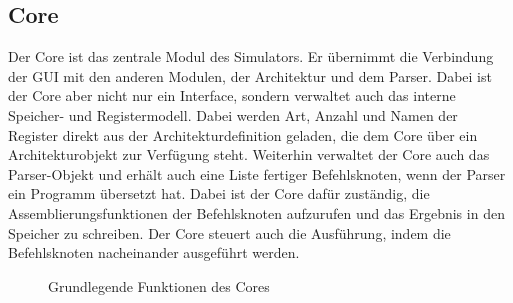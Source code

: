 \subsection{Core}
\label{Dev-Kapitel: Core}

Der Core ist das zentrale Modul des Simulators. Er übernimmt die Verbindung der
GUI mit den anderen Modulen, der Architektur und dem Parser. Dabei ist der Core
aber nicht nur ein Interface, sondern verwaltet auch das interne Speicher- und
Registermodell. Dabei werden Art, Anzahl und Namen der Register direkt aus der
Architekturdefinition geladen, die dem Core über ein Architekturobjekt zur
Verfügung steht. Weiterhin verwaltet der Core auch das Parser-Objekt und erhält
auch eine Liste fertiger Befehlsknoten, wenn der Parser ein Programm übersetzt
hat. Dabei ist der Core dafür zuständig, die Assemblierungsfunktionen der
Befehlsknoten aufzurufen und das Ergebnis in den Speicher zu schreiben. Der Core
steuert auch die Ausführung, indem die Befehlsknoten nacheinander ausgeführt
werden.

\begin{figure}[H]
    \begin{center}
    \end{center}
    \caption{Grundlegende Funktionen des Cores}
    \label{fig:core-overview}
\end{figure}

